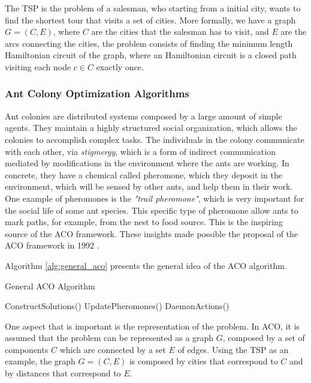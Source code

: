 		The TSP is the problem of a salesman, who starting from a initial city, wants to find the shortest tour that visits a set of cities. More formally, we have a graph $G=(C,E)$, where $C$ are the cities that the salesman has to visit, and $E$ are the arcs connecting the cities, the problem consists of finding the minimum length Hamiltonian circuit of the graph, where an Hamiltonian circuit is a closed path visiting each node $c \in C$ exactly once.
		\subsubsection*{Ant Colony Optimization Algorithms}
		\label{subsubsec:ant_algorithms}

		Ant colonies are distributed systems \cite{acobook} composed by a large amount of simple agents. They maintain a highly structured social organization, which allows the colonies to accomplish complex tasks. The individuals in the colony communicate with each other, via \emph{stigmergy}, which is a form of indirect communication mediated by modifications in the environment where the ants are working. In concrete, they have a chemical called pheromone, which they deposit in the environment, which will be sensed by other ants, and help them in their work. One example of pheromones is the \emph{"trail pheromone"}, which is very important for the social life of some ant species. This specific type of pheromone allow ants to mark paths, for example, from the nest to food source. This is the inspiring source of the ACO framework. 
		These insights made possible the proposal of the ACO framework in 1992 \cite{dorigo92}. 	

		Algorithm \ref{alg:general_aco} presents the general idea of the ACO algorithm.
				\begin{algorithm}
					\caption{General ACO Algorithm}
					\label{alg:general_aco}
					\begin{algorithmic}
						\STATE ConstructSolutions()
						\STATE UpdatePheromones() 
						\STATE DaemonActions() 
					\ENDWHILE
					\end{algorithmic}
				\end{algorithm}
				
				One aspect that is important is the representation of the problem. In ACO, it is assumed that the problem can be represented as a graph $G$, composed by a set of components $C$ which are connected by a set $E$ of edges. Using the TSP as an example, the graph $G=(C,E)$ is composed by cities that correspond to $C$ and by distances that correspond to $E$.
				
